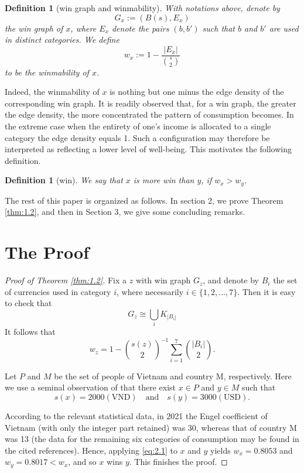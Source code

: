 \documentclass[AER]{AEA}
\newtheorem{definition}[theorem]{Definition}
\begin{document}
\begin{definition}[win graph and winmability]
With notations above, denote by
$$G_{x} := (B(s), E_{x})$$
the win graph of $x$, where $E_{x}$ denote the pairs $(b, b')$ such that $b$ and $b'$ are used in distinct categories. We define
$$w_{x} := 1 - \frac{|E_{x}|}{\binom{s}{2}}$$
to be the winmability of $x$.
\end{definition}

Indeed, the winmability of $x$ is nothing but one minus the edge density of the corresponding win graph. It is readily observed that, for a win graph, the greater the edge density, the more concentrated the pattern of consumption becomes. In the extreme case when the entirety of one's income is allocated to a single category the edge density equals 1. Such a configuration may therefore be interpreted as reflecting a lower level of well-being. This motivates the following definition.

\begin{definition}[win]
We say that $x$ is more win than $y$, if $w_{x} > w_{y}$.
\end{definition}

The rest of this paper is organized as follows. In section 2, we prove Theorem \ref{thm:1.2}, and then in Section 3, we give some concluding remarks.

\section{The Proof}

\begin{proof}[Proof of Theorem \ref{thm:1.2}]
Fix a $z$ with win graph $G_{z}$, and denote by $B_{i}$ the set of currencies used in category $i$, where necessarily $i \in \{1, 2, ..., 7\}$. Then it is easy to check that
$$G_{z} \cong \bigcup_{i} K_{|B_{i}|}$$
It follows that
\begin{equation} \label{eq:2.1}
w_{z} = 1 - \binom{s(z)}{2}^{-1} \sum_{i=1}^{7} \binom{|B_{i}|}{2}.
\end{equation}

Let $P$ and $M$ be the set of people of Vietnam and country M, respectively. Here we use a seminal observation of \citet{ChenPing} that there exist $x \in P$ and $y \in M$ such that
$$s(x) = 2000(\text{VND}) \quad \text{and} \quad s(y) = 3000(\text{USD}).$$

According to the relevant statistical data, in 2021 the Engel coefficient of Vietnam (with only the integer part retained) was 30, whereas that of country M was 13 (the data for the remaining six categories of consumption may be found in the cited references). Hence, applying \eqref{eq:2.1} to $x$ and $y$ yields $w_{x} = 0.8053$ and $w_{y} = 0.8017 < w_{x}$, and so $x$ wins $y$. This finishes the proof.
\end{proof}
\end{document}
